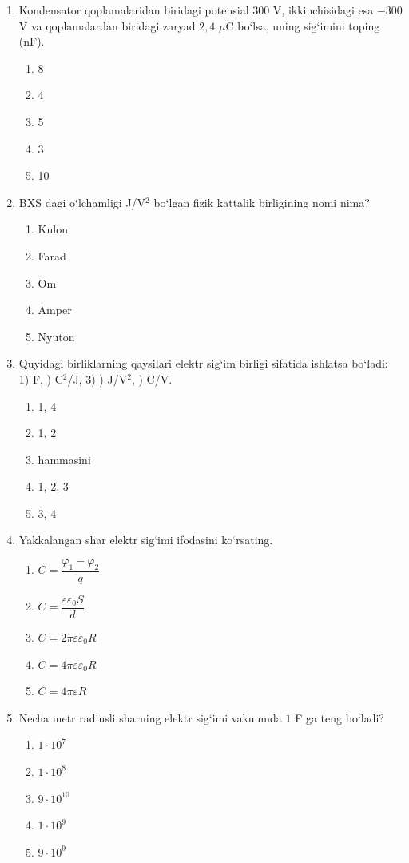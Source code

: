 \begin{enumerate}
\item Kondensator qoplamalaridan biridagi potensial $300$ V, ikkinchisidagi esa $-300$ V va qoplamalardan biridagi zaryad $2,4$ $\mu$C bo‘lsa, uning sig‘imini toping (nF).
\begin{enumerate}[label=\Alph*)]
\item 8
\item 4
\item 5
\item 3
\item 10
\end{enumerate}

\item BXS dagi o‘lchamligi J/V$^2$ bo‘lgan fizik kattalik birligining nomi nima?
\begin{enumerate}[label=\Alph*)]
\item Kulon
\item Farad
\item Om
\item Amper
\item Nyuton
\end{enumerate}

\item Quyidagi birliklarning qaysilari elektr sig‘im birligi sifatida ishlatsa bo‘ladi:\\
1) F, ) C$^2$/J, 3) ) J/V$^2$, ) C/V.

\begin{enumerate}[label=\Alph*)]
\item 1, 4
\item 1, 2
\item hammasini
\item 1, 2, 3
\item 3, 4
\end{enumerate}

\item Yakkalangan shar elektr sig‘imi ifodasini ko‘rsating.
\begin{enumerate}[label=\Alph*)]
\item $C=\dfrac{\varphi_1-\varphi_2}{q}$
\item $C=\dfrac{\varepsilon\varepsilon_0S}{d}$
\item $C=2\pi\varepsilon\varepsilon_0R$
\item $C=4\pi\varepsilon\varepsilon_0R$
\item $C=4\pi\varepsilon R$
\end{enumerate}

\item Necha metr radiusli sharning elektr sig‘imi vakuumda $1$ F ga teng bo‘ladi?
\begin{enumerate}[label=\Alph*)]
\item $1\cdot10^7$
\item $1\cdot10^8$
\item $9\cdot10^{10}$
\item $1\cdot10^9$
\item $9\cdot10^9$
\end{enumerate}


\end{enumerate}
